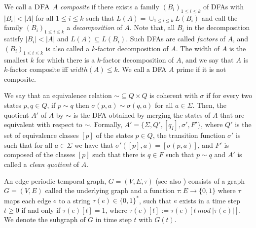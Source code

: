 We call a $\textsc{DFA}$ $A$ \textit{composite} if there exists a family $(B_i)_{1 \leq i \leq k}$ of DFAs with $|B_i| < |A|$ for all $1 \leq i \leq k$ such that $L(A) = \cup_{1\leq i \leq k} L(B_i)$ and call the family $(B_i)_{1\leq i \leq k}$ a \textit{decomposition} of $A$. Note that, all $B_i$ in the decomposition satisfy $|B_i| < |A|$ and $L(A) \subseteq L(B_i)$. Such DFAs are called \textit{factors} of $A$, and $(B_i)_{1\leq i \leq k}$ is also called a $k$-factor decomposition of $A$. The
width of $A$ is the smallest $k$ for which there is a $k$-factor decomposition of $A$, and we say that $A$ is $k$-factor composite iff $width(A) \leq k$. We call a DFA $A$ prime if it is not composite.

We say that an equivalence relation $\sim \subseteq Q \times Q$ is coherent with $\sigma$ if for every two states $p, q \in Q$, if $p \sim q$ then $\sigma(p, a) \sim \sigma(q, a)$ for all $a \in \Sigma$. Then, the quotient $A'$ of $A$ by $\sim$ is the DFA obtained by merging the states of $A$ that are equivalent with respect to $\sim$. Formally, $A' = \{\Sigma, Q' , [q_I], \sigma' , F'\}$, where $Q'$ is the set of equivalence classes $[p]$ of the states $p \in Q$, the transition function $\sigma'$ is such that for all $a \in \Sigma$ we have that $\sigma' ([p], a) = [\sigma(p, a)]$, and $F'$ is composed of the classes $[p]$ such that there is $q \in F$ such that $p \sim q$ and $A'$ is called a \textit{clean quotient} of $A$.


An edge periodic temporal graph, $G = (V, E, \tau)$ (see also \cite{erlebach2020game}) consists of a graph $G = (V, E)$ called the underlying graph and a function $\tau : E \rightarrow \{0, 1\}$ where $\tau$ maps each edge $e$ to a string $\tau(e) \in \{0, 1\}^*$, such that $e$ exists in a time step $t \geq 0$ if and only if $\tau(e)[t] = 1$, where $\tau(e)[t] := \tau(e)[t~ mod~ |\tau(e)|]$. We denote the subgraph of $G$ in time step $t$ with $G(t)$.


